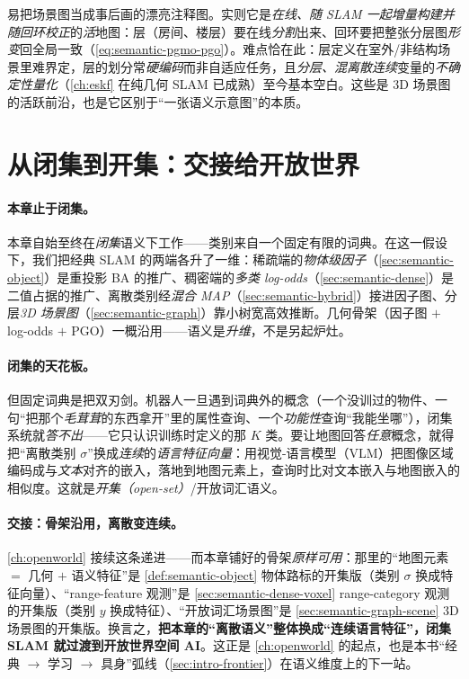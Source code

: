 \begin{pitfall}
易把场景图当成事后画的漂亮注释图。实则它是\emph{在线、随 SLAM 一起增量构建并随回环校正}的\emph{活}地图：层（房间、楼层）要在线\emph{分割}出来、回环要把整张分层图\emph{形变}回全局一致（\cref{eq:semantic-pgmo-pgo}）。难点恰在此：层定义在室外/非结构场景里难界定，层的划分常\emph{硬编码}而非自适应任务，且\emph{分层、混离散连续}变量的\emph{不确定性量化}（\cref{ch:eskf} 在纯几何 SLAM 已成熟）至今基本空白。这些是 3D 场景图的活跃前沿，也是它区别于“一张语义示意图”的本质。
\end{pitfall}

\section{从闭集到开集：交接给开放世界}
\label{sec:semantic-closing}

\paragraph{本章止于闭集。}
本章自始至终在\emph{闭集}语义下工作——类别来自一个固定有限的词典。在这一假设下，我们把经典 SLAM 的两端各升了一维：稀疏端的\emph{物体级因子}（\cref{sec:semantic-object}）是重投影 BA 的推广、稠密端的\emph{多类 log-odds}（\cref{sec:semantic-dense}）是二值占据的推广、离散类别经\emph{混合 MAP}（\cref{sec:semantic-hybrid}）接进因子图、分层\emph{3D 场景图}（\cref{sec:semantic-graph}）靠小树宽高效推断。几何骨架（因子图 $+$ log-odds $+$ PGO）一概沿用——语义是\emph{升维}，不是另起炉灶。

\paragraph{闭集的天花板。}
但固定词典是把双刃剑。机器人一旦遇到词典外的概念（一个没训过的物件、一句“把那个\emph{毛茸茸}的东西拿开”里的属性查询、一个\emph{功能性}查询“我能坐哪”），闭集系统就\emph{答不出}——它只认识训练时定义的那 $K$ 类。要让地图回答\emph{任意}概念，就得把“离散类别 $\sigma$”换成\emph{连续}的\emph{语言特征向量}：用视觉-语言模型（VLM）把图像区域编码成与\emph{文本}对齐的嵌入，落地到地图元素上，查询时比对文本嵌入与地图嵌入的相似度。这就是\emph{开集（open-set）}/开放词汇语义。

\paragraph{交接：骨架沿用，离散变连续。}
\cref{ch:openworld} 接续这条递进——而本章铺好的骨架\emph{原样可用}：那里的“地图元素 $=$ 几何 $+$ 语义特征”是 \cref{def:semantic-object} 物体路标的开集版（类别 $\sigma$ 换成特征向量）、“range-feature 观测”是 \cref{sec:semantic-dense-voxel} range-category 观测的开集版（类别 $y$ 换成特征）、“开放词汇场景图”是 \cref{sec:semantic-graph-scene} 3D 场景图的开集版。换言之，\textbf{把本章的“离散语义”整体换成“连续语言特征”，闭集 SLAM 就过渡到开放世界空间 AI}。这正是 \cref{ch:openworld} 的起点，也是本书“经典 $\to$ 学习 $\to$ 具身”弧线（\cref{sec:intro-frontier}）在语义维度上的下一站。

